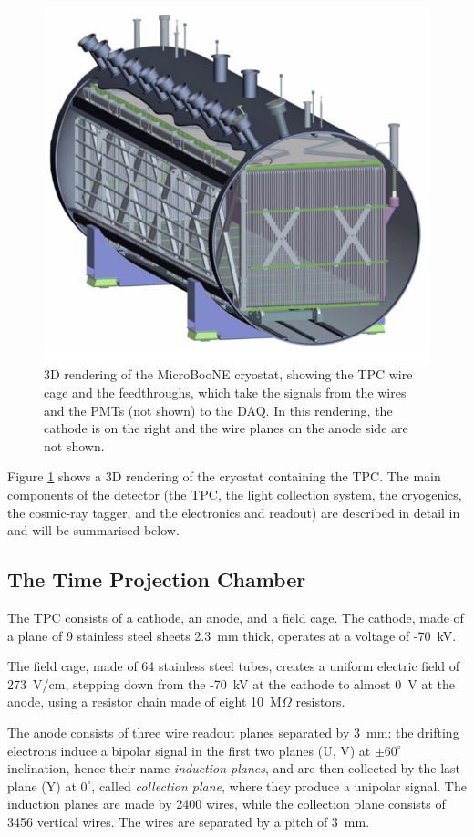 \begin{figure}[htbp]
    \centering
    \includegraphics[width=0.7\linewidth]{figures/detector.png}
    \caption{3D rendering of the MicroBooNE cryostat, showing the TPC wire cage and the feedthroughs, which take the signals from the wires and the PMTs (not shown) to the DAQ. In this rendering, the cathode is on the right and the wire planes on the anode side are not shown.}
    \label{fig:detector}
\end{figure}

Figure \ref{fig:detector} shows a 3D rendering of the cryostat containing the TPC. The main components of the detector (the TPC, the light collection system, the cryogenics, the cosmic-ray tagger, and the electronics and readout) are described in detail in \cite{Acciarri:2016smi} and will be summarised below. 

\subsection{The Time Projection Chamber}\label{sec:tpc}
The TPC consists of a cathode, an anode, and a field cage. 
The cathode, made of a plane of 9 stainless steel sheets 2.3~mm thick, operates at a voltage of -70~kV.

The field cage, made of 64 stainless steel tubes, creates a uniform electric field of 273~V/cm, stepping down from the -70~kV at the cathode to almost 0~V at the anode, using a resistor chain made of eight 10~M$\Omega$ resistors.

The anode consists of three wire readout planes separated by 3~mm: the drifting electrons induce a bipolar signal in the first two planes (U, V) at $\pm60^{\circ}$ inclination, hence their name \emph{induction planes}, and are then collected by the last plane (Y) at $0^{\circ}$, called \emph{collection plane}, where they produce a unipolar signal. The induction planes are made by 2400 wires, while the collection plane consists of 3456 vertical wires. The wires are separated by a pitch of 3~mm.

